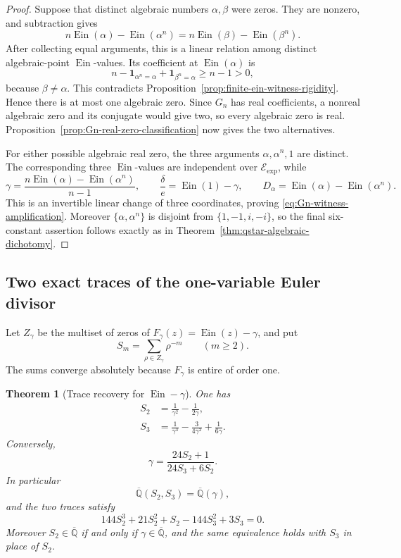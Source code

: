 \documentclass[11pt]{article}
\newtheorem{theorem}{Theorem}[section]
\theoremstyle{definition}
\theoremstyle{remark}
\newcommand{\Qbar}{\overline{\mathbb Q}}
\newcommand{\Ein}{\operatorname{Ein}}
\newcommand{\Eexp}{\mathcal E_{\mathrm{exp}}}
\begin{document}
\begin{proof}
Suppose that distinct algebraic numbers \(\alpha,\beta\) were zeros.  They
are nonzero, and subtraction gives
\[
 n\Ein(\alpha)-\Ein(\alpha^n)
 =n\Ein(\beta)-\Ein(\beta^n).
\]
After collecting equal arguments, this is a linear relation among distinct
algebraic-point \(\Ein\)-values.  Its coefficient at
\(\Ein(\alpha)\) is
\[
 n-\mathbf1_{\alpha^n=\alpha}
   +\mathbf1_{\beta^n=\alpha}\ge n-1>0,
\]
because \(\beta\ne\alpha\).  This contradicts
Proposition~\ref{prop:finite-ein-witness-rigidity}.  Hence there is at most
one algebraic zero.  Since \(G_n\) has real coefficients, a nonreal
algebraic zero and its conjugate would give two, so every algebraic zero is
real.  Proposition~\ref{prop:Gn-real-zero-classification} now gives the two
alternatives.

For either possible algebraic real zero, the three arguments
\(\alpha,\alpha^n,1\) are distinct.  The corresponding three
\(\Ein\)-values are independent over \(\Eexp\), while
\[
 \gamma=\frac{n\Ein(\alpha)-\Ein(\alpha^n)}{n-1},\qquad
 \frac\delta e=\Ein(1)-\gamma,\qquad
 D_\alpha=\Ein(\alpha)-\Ein(\alpha^n).
\]
This is an invertible linear change of three coordinates, proving
\eqref{eq:Gn-witness-amplification}.  Moreover
\(\{\alpha,\alpha^n\}\) is disjoint from \(\{1,-1,i,-i\}\), so the final
six-constant assertion follows exactly as in
Theorem~\ref{thm:qstar-algebraic-dichotomy}.
\end{proof}

\subsection{Two exact traces of the one-variable Euler divisor}

Let \(Z_\gamma\) be the multiset of zeros of
\(F_\gamma(z)=\Ein(z)-\gamma\), and put
\begin{equation}\label{eq:one-variable-traces}
 S_m=\sum_{\rho\in Z_\gamma}\rho^{-m}\qquad(m\ge2).
\end{equation}
The sums converge absolutely because \(F_\gamma\) is entire of order one.

\begin{theorem}[Trace recovery for \(\Ein-\gamma\)]
\label{thm:ein-gamma-trace-recovery}
One has
\begin{align}
 S_2&=\frac1{\gamma^2}-\frac1{2\gamma},
 \label{eq:ein-gamma-S2}\\
 S_3&=\frac1{\gamma^3}-\frac3{4\gamma^2}+\frac1{6\gamma}.
 \label{eq:ein-gamma-S3}
\end{align}
Conversely,
\begin{equation}\label{eq:ein-gamma-trace-inversion}
 \boxed{\displaystyle
 \gamma=\frac{24S_2+1}{24S_3+6S_2}.}
\end{equation}
In particular
\[
 \Qbar(S_2,S_3)=\Qbar(\gamma),
\]
and the two traces satisfy
\begin{equation}\label{eq:S2-S3-curve}
 144S_2^3+21S_2^2+S_2-144S_3^2+3S_3=0.
\end{equation}
Moreover \(S_2\in\Qbar\) if and only if \(\gamma\in\Qbar\), and the same
equivalence holds with \(S_3\) in place of \(S_2\).
\end{theorem}
\end{document}
